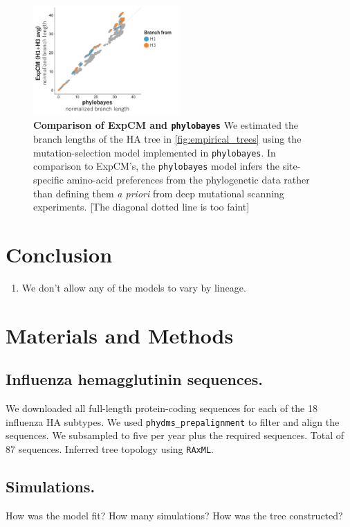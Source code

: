 \documentclass[11pt]{article}
\newcommand\jdbcomment[1]{{\color{red}[#1]}}
\begin{document}
\begin{figure}
\centerline{\includegraphics[width=0.5\textwidth]{figures/phylobayes.pdf}}
\caption{\label{fig:phylobayes}
\textbf{Comparison of ExpCM and \texttt{phylobayes}}
We estimated the branch lengths of the HA tree in \ref{fig:empirical_trees} using the mutation-selection model implemented in \texttt{phylobayes}. 
In comparison to ExpCM's, the \texttt{phylobayes} model infers the site-specific amino-acid preferences from the phylogenetic data rather than defining them \textit{a priori} from deep mutational scanning experiments. 
\jdbcomment{The diagonal dotted line is too faint}
}
\end{figure}

\section*{Conclusion}

\begin{enumerate}
  \item We don't allow any of the models to vary by lineage. 
\end{enumerate}

\newpage
\section*{Materials and Methods}

\subsection*{Influenza hemagglutinin sequences.}
We downloaded all full-length protein-coding sequences for each of the 18 influenza HA subtypes. 
We used \texttt{phydms\_prepalignment} \citep{hilton2017phydms} to filter and align the sequences. 
We subsampled to five per year plus the required sequences. 
Total of 87 sequences. 
Inferred tree topology using \texttt{RAxML}. 

\subsection*{Simulations.}
How was the model fit? 
How many simulations? 
How was the tree constructed? 
\end{document}
